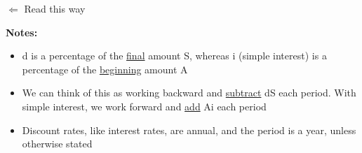 \documentclass{article}
\begin{document}
    \begin{center}
    {$\Leftarrow$}  {Read this way}
    \end{center}

\begin{flushleft}
        \textbf{Notes:} \\
    \end{flushleft}


    \begin{itemize}
        \item d is a percentage of the \underline{final} amount S, whereas i (simple interest) is a percentage of the \underline{beginning} amount A
        \item We can think of this as working backward and \underline{subtract} dS each period.  With simple interest, we work forward and \underline{add} Ai each period
        \item Discount rates, like interest rates, are annual, and the period is a year, unless otherwise stated
    \end{itemize}
\end{document}
